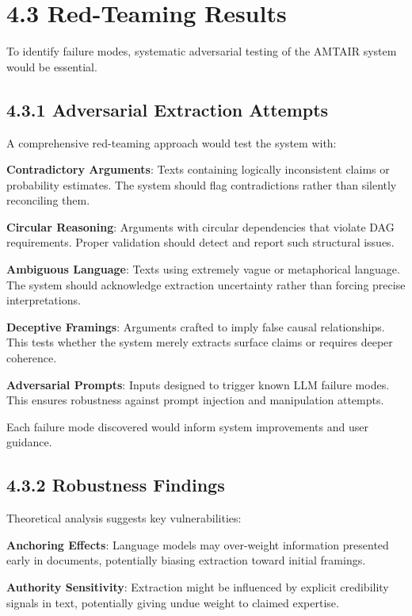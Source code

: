 \documentclass[
  11pt,
  letterpaper,
  openany]{book}
\begin{document}
\section{4.3 Red-Teaming Results}\label{sec-red-teaming}

To identify failure modes, systematic adversarial testing of the AMTAIR
system would be essential.

\subsection{4.3.1 Adversarial Extraction
Attempts}\label{sec-adversarial-extraction}

A comprehensive red-teaming approach would test the system with:

\textbf{Contradictory Arguments}: Texts containing logically
inconsistent claims or probability estimates. The system should flag
contradictions rather than silently reconciling them.

\textbf{Circular Reasoning}: Arguments with circular dependencies that
violate DAG requirements. Proper validation should detect and report
such structural issues.

\textbf{Ambiguous Language}: Texts using extremely vague or metaphorical
language. The system should acknowledge extraction uncertainty rather
than forcing precise interpretations.

\textbf{Deceptive Framings}: Arguments crafted to imply false causal
relationships. This tests whether the system merely extracts surface
claims or requires deeper coherence.

\textbf{Adversarial Prompts}: Inputs designed to trigger known LLM
failure modes. This ensures robustness against prompt injection and
manipulation attempts.

Each failure mode discovered would inform system improvements and user
guidance.

\subsection{4.3.2 Robustness Findings}\label{sec-robustness-findings}

Theoretical analysis suggests key vulnerabilities:

\textbf{Anchoring Effects}: Language models may over-weight information
presented early in documents, potentially biasing extraction toward
initial framings.

\textbf{Authority Sensitivity}: Extraction might be influenced by
explicit credibility signals in text, potentially giving undue weight to
claimed expertise.
\end{document}
